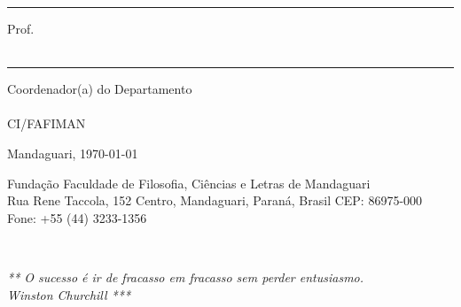 \documentclass{tcc}
\begin{document}
\vspace{0.25in}

\hrule
\noindent Prof. \profc\\
\instc\\

\vspace{0.8in}

\hrule
\noindent Coordenador(a) do Departamento \departamento\\
\coordenador\\
CI/FAFIMAN\\

\vfill

\begin{center}
Mandaguari, \today
\end{center}

\vspace{0.05in}

\begin{center}
\footnotesize{ Fundação Faculdade de Filosofia, Ciências e Letras de Mandaguari\\
Rua Rene Taccola, 152  Centro, Mandaguari, Paraná, Brasil CEP: 86975-000\\
Fone: +55 (44) 3233-1356}
\end{center}
\afterpage{\blankpage \addtocounter{page}{1}}
\newpage
$ $
\vfill

\begin{flushright}
\em *** O sucesso é ir de fracasso em fracasso sem perder entusiasmo.\\
Winston Churchill ***
\end{flushright}

\afterpage{\blankpage \addtocounter{page}{1}}

\newpage

\section*{} 


\newpage



\newpage


\newpage



\newpage

\end{document}
